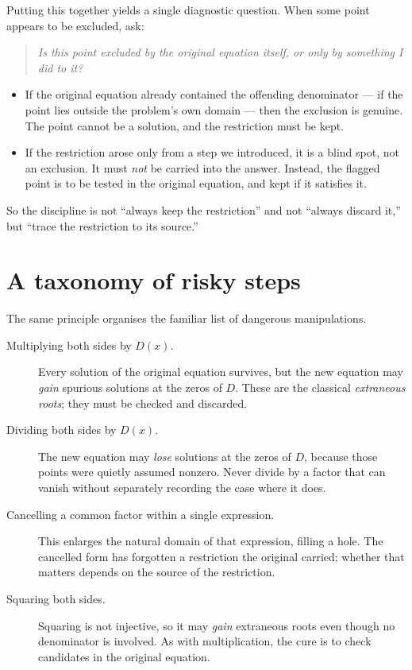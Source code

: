 \documentclass{essay}
\begin{document}
Putting this together yields a single diagnostic question. When some point appears to be
excluded, ask:
\begin{quote}
  \emph{Is this point excluded by the original equation itself, or only by something I did to
  it?}
\end{quote}
\begin{itemize}
  \item If the original equation already contained the offending denominator --- if the point
    lies outside the problem's own domain --- then the exclusion is genuine. The point cannot be
    a solution, and the restriction must be kept.
  \item If the restriction arose only from a step we introduced, it is a blind spot, not an
    exclusion. It must \emph{not} be carried into the answer. Instead, the flagged point is to
    be tested in the original equation, and kept if it satisfies it.
\end{itemize}
So the discipline is not ``always keep the restriction'' and not ``always discard it,'' but
``trace the restriction to its source.''

\section{A taxonomy of risky steps}

The same principle organises the familiar list of dangerous manipulations.
\begin{description}
  \item[Multiplying both sides by \(D(x)\).] Every solution of the original equation survives,
    but the new equation may \emph{gain} spurious solutions at the zeros of \(D\). These are the
    classical \emph{extraneous roots}; they must be checked and discarded.
  \item[Dividing both sides by \(D(x)\).] The new equation may \emph{lose} solutions at the
    zeros of \(D\), because those points were quietly assumed nonzero. Never divide by a factor
    that can vanish without separately recording the case where it does.
  \item[Cancelling a common factor within a single expression.] This enlarges the natural
    domain of that expression, filling a hole. The cancelled form has forgotten a restriction
    the original carried; whether that matters depends on the source of the restriction.
  \item[Squaring both sides.] Squaring is not injective, so it may \emph{gain} extraneous
    roots even though no denominator is involved. As with multiplication, the cure is to check
    candidates in the original equation.
\end{description}
\end{document}
